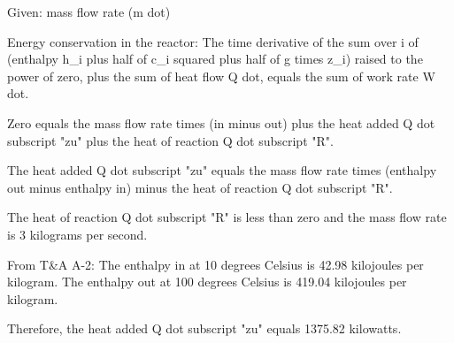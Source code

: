 Given: mass flow rate (m dot)

Energy conservation in the reactor:
The time derivative of the sum over i of (enthalpy h_i plus half of c_i squared plus half of g times z_i) raised to the power of zero, plus the sum of heat flow Q dot, equals the sum of work rate W dot.

Zero equals the mass flow rate times (in minus out) plus the heat added Q dot subscript "zu" plus the heat of reaction Q dot subscript "R".

The heat added Q dot subscript "zu" equals the mass flow rate times (enthalpy out minus enthalpy in) minus the heat of reaction Q dot subscript "R".

The heat of reaction Q dot subscript "R" is less than zero and the mass flow rate is 3 kilograms per second.

From T&A A-2:
The enthalpy in at 10 degrees Celsius is 42.98 kilojoules per kilogram.
The enthalpy out at 100 degrees Celsius is 419.04 kilojoules per kilogram.

Therefore, the heat added Q dot subscript "zu" equals 1375.82 kilowatts.